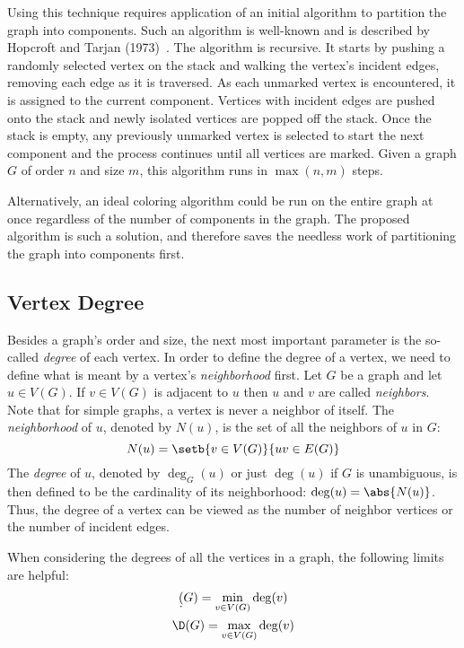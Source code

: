 Using this technique requires application of an initial algorithm to partition the graph into components.  Such an
algorithm is well-known and is described by Hopcroft and Tarjan (1973)~\cite{hopcroft}.  The algorithm is
recursive.  It starts by pushing a randomly selected vertex on the stack and walking the vertex's incident edges,
removing each edge as it is traversed.  As each unmarked vertex is encountered, it is assigned to the current
component.  Vertices with incident edges are pushed onto the stack and newly isolated vertices are popped off the
stack.  Once the stack is empty, any previously unmarked vertex is selected to start the next component and the
process continues until all vertices are marked.  Given a graph \(G\) of order \(n\) and size \(m\), this algorithm
runs in \(\max(n,m)\) steps.

Alternatively, an ideal coloring algorithm could be run on the entire graph at once regardless of the number of
components in the graph.  The proposed algorithm is such a solution, and therefore saves the needless work of
partitioning the graph into components first.

\subsection{Vertex Degree}\label{sec:sub:degree}

Besides a graph's order and size, the next most important parameter is the so-called \emph{degree} of each vertex.
In order to define the degree of a vertex, we need to define what is meant by a vertex's \emph{neighborhood} first.
Let \(G\) be a graph and let \(u\in V(G)\).  If \(v\in V(G)\) is adjacent to \(u\) then \(u\) and \(v\) are called
\emph{neighbors}.  Note that for simple graphs, a vertex is never a neighbor of itself.  The \emph{neighborhood} of
\(u\), denoted by \(N(u)\), is the set of all the neighbors of \(u\) in \(G\):
\[N(u)=\setb{v\in V(G)}{uv\in E(G)}\]
The \emph{degree} of \(u\), denoted by \(\deg_G(u)\) or just \(\deg(u)\) if \(G\) is unambiguous, is then defined
to be the cardinality of its neighborhood: \(\deg(u)=\abs{N(u)}\).  Thus, the degree of a vertex can be viewed as
the number of neighbor vertices or the number of incident edges.

When considering the degrees of all the vertices in a graph, the following limits are helpful:
\begin{gather*}
  \d(G)=\min_{v\in V(G)}\deg(v) \\
  \D(G)=\max_{v\in V(G)}\deg(v)
\end{gather*}

